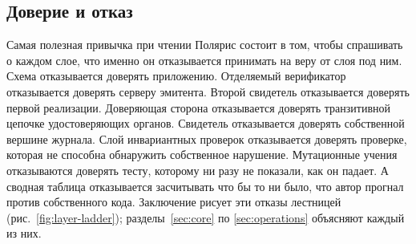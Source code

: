 \subsection{Доверие и отказ}

Самая полезная привычка при чтении Полярис состоит в том, чтобы спрашивать о каждом слое, что
именно он отказывается принимать на веру от слоя под ним. Схема отказывается доверять приложению.
Отделяемый верификатор отказывается доверять серверу эмитента. Второй свидетель отказывается
доверять первой реализации. Доверяющая сторона отказывается доверять транзитивной цепочке
удостоверяющих органов. Свидетель отказывается доверять собственной вершине журнала. Слой
инвариантных проверок отказывается доверять проверке, которая не способна обнаружить собственное
нарушение. Мутационные учения отказываются доверять тесту, которому ни разу не показали, как он
падает. А сводная таблица отказывается засчитывать что бы то ни было, что автор прогнал против
собственного кода. Заключение рисует эти отказы лестницей (рис.~\ref{fig:layer-ladder});
разделы~\ref{sec:core} по \ref{sec:operations} объясняют каждый из них.
